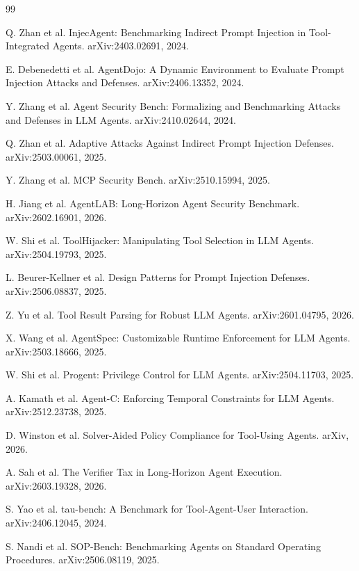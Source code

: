 \documentclass[10pt,twocolumn]{article}
\begin{document}
\begin{thebibliography}{99}

Q. Zhan et al.
\newblock InjecAgent: Benchmarking Indirect Prompt Injection in Tool-Integrated Agents.
\newblock arXiv:2403.02691, 2024.

E. Debenedetti et al.
\newblock AgentDojo: A Dynamic Environment to Evaluate Prompt Injection Attacks and Defenses.
\newblock arXiv:2406.13352, 2024.

Y. Zhang et al.
\newblock Agent Security Bench: Formalizing and Benchmarking Attacks and Defenses in LLM Agents.
\newblock arXiv:2410.02644, 2024.

Q. Zhan et al.
\newblock Adaptive Attacks Against Indirect Prompt Injection Defenses.
\newblock arXiv:2503.00061, 2025.

Y. Zhang et al.
\newblock MCP Security Bench.
\newblock arXiv:2510.15994, 2025.

H. Jiang et al.
\newblock AgentLAB: Long-Horizon Agent Security Benchmark.
\newblock arXiv:2602.16901, 2026.

W. Shi et al.
\newblock ToolHijacker: Manipulating Tool Selection in LLM Agents.
\newblock arXiv:2504.19793, 2025.

L. Beurer-Kellner et al.
\newblock Design Patterns for Prompt Injection Defenses.
\newblock arXiv:2506.08837, 2025.

Z. Yu et al.
\newblock Tool Result Parsing for Robust LLM Agents.
\newblock arXiv:2601.04795, 2026.

X. Wang et al.
\newblock AgentSpec: Customizable Runtime Enforcement for LLM Agents.
\newblock arXiv:2503.18666, 2025.

W. Shi et al.
\newblock Progent: Privilege Control for LLM Agents.
\newblock arXiv:2504.11703, 2025.

A. Kamath et al.
\newblock Agent-C: Enforcing Temporal Constraints for LLM Agents.
\newblock arXiv:2512.23738, 2025.

D. Winston et al.
\newblock Solver-Aided Policy Compliance for Tool-Using Agents.
\newblock arXiv, 2026.

A. Sah et al.
\newblock The Verifier Tax in Long-Horizon Agent Execution.
\newblock arXiv:2603.19328, 2026.

S. Yao et al.
\newblock tau-bench: A Benchmark for Tool-Agent-User Interaction.
\newblock arXiv:2406.12045, 2024.

S. Nandi et al.
\newblock SOP-Bench: Benchmarking Agents on Standard Operating Procedures.
\newblock arXiv:2506.08119, 2025.

\end{thebibliography}
\end{document}
